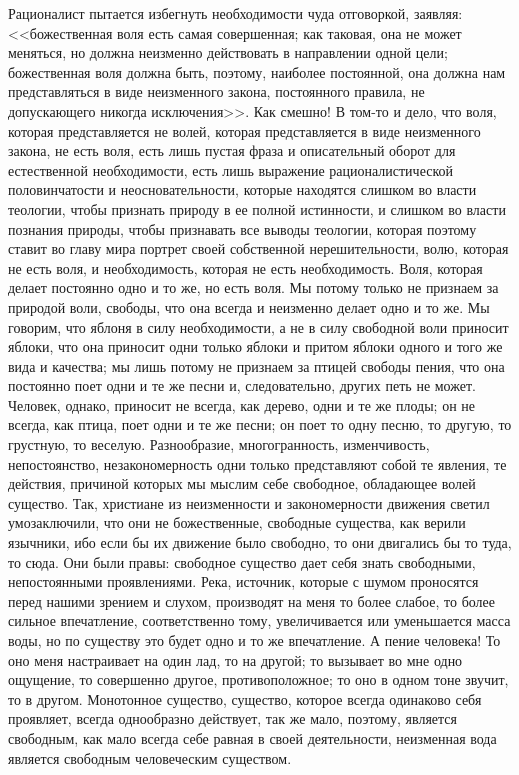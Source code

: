 \documentclass[12pt]{article}
\begin{document}
Рационалист пытается избегнуть необходимости чуда отговоркой, заявляя: <<божественная воля есть самая совершенная; как таковая, она не может меняться, но должна неизменно действовать в направлении одной цели; божественная воля должна быть, поэтому, наиболее постоянной, она должна нам представляться в виде неизменного закона, постоянного правила, не допускающего никогда исключения>>. Как смешно! В том-то и дело, что воля, которая представляется не волей, которая представляется в виде неизменного закона, не есть воля, есть лишь пустая фраза и описательный оборот для естественной необходимости, есть лишь выражение рационалистической половинчатости и неосновательности, которые находятся слишком во власти теологии, чтобы признать природу в ее полной истинности, и слишком во власти познания природы, чтобы признавать все выводы теологии, которая поэтому ставит во главу мира портрет своей собственной нерешительности, волю, которая не есть воля, и необходимость, которая не есть необходимость. Воля, которая делает постоянно одно и то же, но есть воля. Мы потому только не признаем за природой воли, свободы, что она всегда и неизменно делает одно и то же. Мы говорим, что яблоня в силу необходимости, а не в силу свободной воли приносит яблоки, что она приносит одни только яблоки и притом яблоки одного и того же вида и качества; мы лишь потому не признаем за птицей свободы пения, что она постоянно поет одни и те же песни и, следовательно, других петь не может. Человек, однако, приносит не всегда, как дерево, одни и те же плоды; он не всегда, как птица, поет одни и те же песни; он поет то одну песню, то другую, то грустную, то веселую. Разнообразие, многогранность, изменчивость, непостоянство, незакономерность одни только представляют собой те явления, те действия, причиной которых мы мыслим себе свободное, обладающее волей существо. Так, христиане из неизменности и закономерности движения светил умозаключили, что они не божественные, свободные существа, как верили язычники, ибо если бы их движение было свободно, то они двигались бы то туда, то сюда. Они были правы: свободное существо дает себя знать свободными, непостоянными проявлениями. Река, источник, которые с шумом проносятся перед нашими зрением и слухом, производят на меня то более слабое, то более сильное впечатление, соответственно тому, увеличивается или уменьшается масса воды, но по существу это будет одно и то же впечатление. А пение человека! То оно меня настраивает на один лад, то на другой; то вызывает во мне одно ощущение, то совершенно другое, противоположное; то оно в одном тоне звучит, то в другом. Монотонное существо, существо, которое всегда одинаково себя проявляет, всегда однообразно действует, так же мало, поэтому, является свободным, как мало всегда себе равная в своей деятельности, неизменная вода является свободным человеческим существом. 
\end{document}
